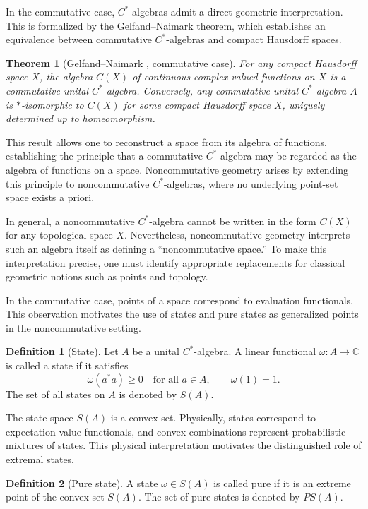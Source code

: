 \documentclass[12pt]{article}
\newcommand{\C}{\mathbb{C}}
\theoremstyle{definition} %
\newtheorem{definition}{Definition}
\theoremstyle{plain} %
\newtheorem{theorem}{Theorem}[section]
\theoremstyle{remark} %
\theoremstyle{underline}
\begin{document}
In the commutative case, $C^*$-algebras admit a direct geometric interpretation. This is formalized by the Gelfand--Naimark theorem, which establishes an equivalence between commutative $C^*$-algebras and compact Hausdorff spaces.

\begin{theorem}[Gelfand--Naimark \cite{1943OnTI}, commutative case]
For any compact Hausdorff space $X$, the algebra $C(X)$ of continuous complex-valued functions on $X$ is a commutative unital $C^*$-algebra. Conversely, any commutative unital $C^*$-algebra $A$ is $*$-isomorphic to $C(X)$ for some compact Hausdorff space $X$, uniquely determined up to homeomorphism.
\end{theorem}

This result allows one to reconstruct a space from its algebra of functions, establishing the principle that a commutative $C^*$-algebra may be regarded as the algebra of functions on a space. Noncommutative geometry arises by extending this principle to noncommutative $C^*$-algebras, where no underlying point-set space exists a priori.

\medskip

In general, a noncommutative $C^*$-algebra cannot be written in the form $C(X)$ for any topological space $X$. Nevertheless, noncommutative geometry interprets such an algebra itself as defining a ``noncommutative space.'' To make this interpretation precise, one must identify appropriate replacements for classical geometric notions such as points and topology.

In the commutative case, points of a space correspond to evaluation functionals. This observation motivates the use of states and pure states as generalized points in the noncommutative setting.

\begin{definition}[State]
    Let $A$ be a unital $C^*$-algebra. A linear functional $\omega:A\to\C$ is called a state if it satisfies
    \[
        \omega(a^*a) \ge 0 \quad \text{for all } a\in A, 
        \qquad \omega(1)=1.
    \]
    The set of all states on $A$ is denoted by $S(A)$.
\end{definition}

The state space $S(A)$ is a convex set. Physically, states correspond to expectation-value functionals, and convex combinations represent probabilistic mixtures of states. This physical interpretation motivates the distinguished role of extremal states.

\begin{definition}[Pure state]
    A state $\omega\in S(A)$ is called pure if it is an extreme point of the convex set $S(A)$. The set of pure states is denoted by $PS(A)$.
\end{definition}
\end{document}
